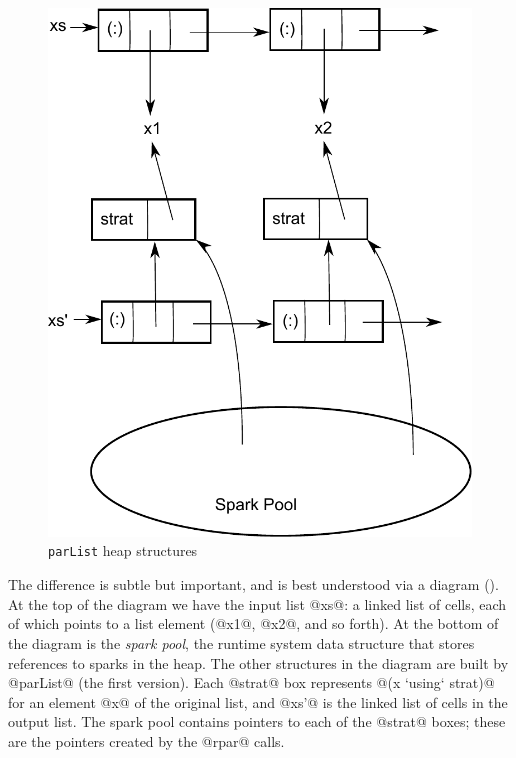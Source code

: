 \begin{figure}
\begin{center}
\includegraphics[scale=0.6]{parlist1.pdf}
\end{center}
\caption{\texttt{parList} heap structures}
\label{fig:parlist-heap}
\end{figure}

The difference is subtle but important, and is best understood via a
diagram ().  At the top of the diagram we have
the input list @xs@: a linked list of cells, each of which points to a
list element (@x1@, @x2@, and so forth).  At the bottom of the diagram
is the \emph{spark pool}, the runtime system data structure that
stores references to sparks in the heap.  The other structures in the
diagram are built by @parList@ (the first version).  Each @strat@ box
represents @(x `using` strat)@ for an element @x@ of the original list, and @xs'@ is the linked list of cells in the output list.  The
spark pool contains pointers to each of the @strat@ boxes; these are
the pointers created by the @rpar@ calls.

